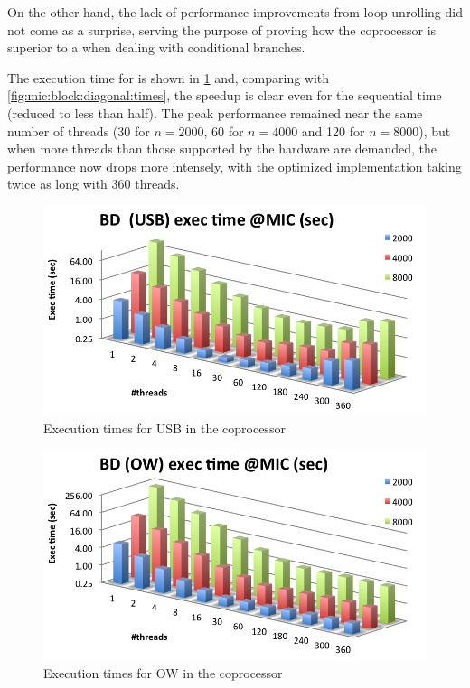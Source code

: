 \documentclass[../thesis]{subfiles}
\begin{document}
	On the other hand, the lack of performance improvements from loop unrolling did not come as a surprise, serving the purpose of proving how the \intel\xeonphi coprocessor is superior to a \gpu when dealing with conditional branches.

	The execution time for \usb is shown in \cref{fig:mic:optims:usb:times} and, comparing with \cref{fig:mic:block:diagonal:times}, the speedup is clear even for the sequential time (reduced to less than half). The peak performance remained near the same number of threads (30 for $n=2000$, 60 for $n=4000$ and 120 for $n=8000$), but when more threads than those supported by the hardware are demanded, the performance now drops more intensely, with the optimized implementation taking twice as long with 360 threads.

	\begin{figure}[p]
		\centering
		\includegraphics[height=0.25\textheight]{assets/images/mic/optims/mic-usb-times.png}
		\caption{Execution times for USB in the \intel\xeonphi coprocessor}
		\label{fig:mic:optims:usb:times}
	\end{figure}
	
	\begin{figure}[p]
		\centering
		\includegraphics[height=0.25\textheight]{assets/images/mic/optims/mic-ow-times.png}
		\caption{Execution times for OW in the \intel\xeonphi coprocessor}
		\label{fig:mic:optims:ow:times}
	\end{figure}
\end{document}
